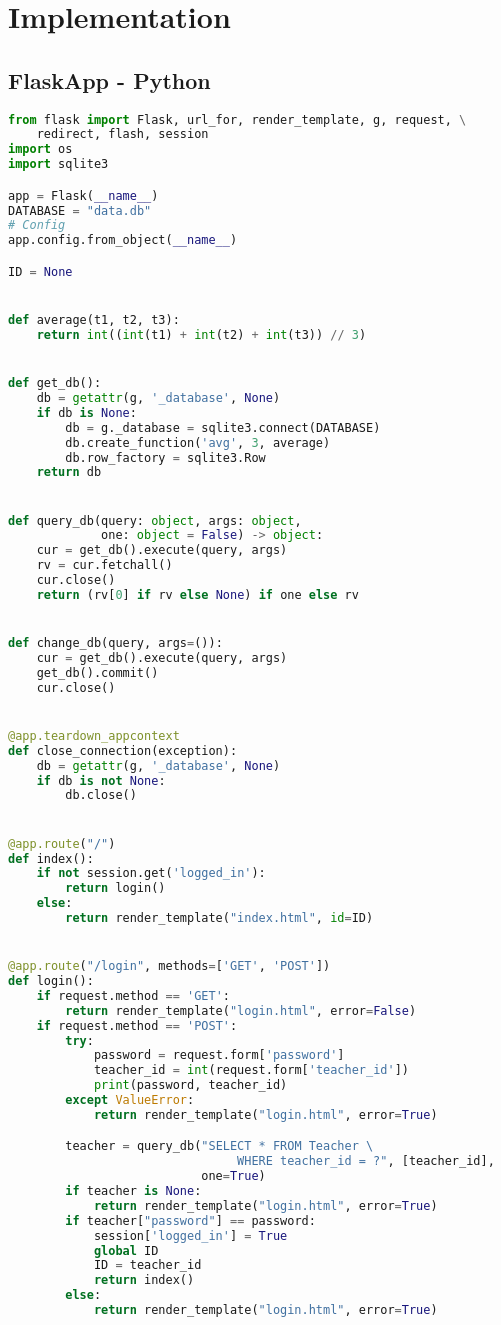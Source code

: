 \chapter{Implementation}

\section{FlaskApp - Python}
\begin{lstlisting}[language=python]
from flask import Flask, url_for, render_template, g, request, \
    redirect, flash, session
import os
import sqlite3

app = Flask(__name__)
DATABASE = "data.db"
# Config
app.config.from_object(__name__)

ID = None


def average(t1, t2, t3):
    return int((int(t1) + int(t2) + int(t3)) // 3)


def get_db():
    db = getattr(g, '_database', None)
    if db is None:
        db = g._database = sqlite3.connect(DATABASE)
        db.create_function('avg', 3, average)
        db.row_factory = sqlite3.Row
    return db


def query_db(query: object, args: object,
             one: object = False) -> object:
    cur = get_db().execute(query, args)
    rv = cur.fetchall()
    cur.close()
    return (rv[0] if rv else None) if one else rv


def change_db(query, args=()):
    cur = get_db().execute(query, args)
    get_db().commit()
    cur.close()


@app.teardown_appcontext
def close_connection(exception):
    db = getattr(g, '_database', None)
    if db is not None:
        db.close()


@app.route("/")
def index():
    if not session.get('logged_in'):
        return login()
    else:
        return render_template("index.html", id=ID)


@app.route("/login", methods=['GET', 'POST'])
def login():
    if request.method == 'GET':
        return render_template("login.html", error=False)
    if request.method == 'POST':
        try:
            password = request.form['password']
            teacher_id = int(request.form['teacher_id'])
            print(password, teacher_id)
        except ValueError:
            return render_template("login.html", error=True)

        teacher = query_db("SELECT * FROM Teacher \
                                WHERE teacher_id = ?", [teacher_id],
                           one=True)
        if teacher is None:
            return render_template("login.html", error=True)
        if teacher["password"] == password:
            session['logged_in'] = True
            global ID
            ID = teacher_id
            return index()
        else:
            return render_template("login.html", error=True)



\end{lstlisting}
